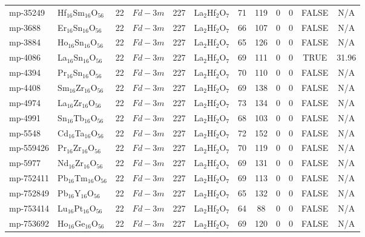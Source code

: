 {\begin{longtable}{llcccccccccc}
    mp-35249 & Hf$_{16}$Sm$_{16}$O$_{56}$ & 22    & $Fd-3m$ & 227   & La$_{2}$Hf$_{2}$O$_{7}$ & 71    & 119   & 0     & 0     & FALSE & N/A \\
    mp-3688 & Er$_{16}$Sn$_{16}$O$_{56}$ & 22    & $Fd-3m$ & 227   & La$_{2}$Hf$_{2}$O$_{7}$ & 66    & 107   & 0     & 0     & FALSE & N/A \\
    mp-3884 & Ho$_{16}$Sn$_{16}$O$_{56}$ & 22    & $Fd-3m$ & 227   & La$_{2}$Hf$_{2}$O$_{7}$ & 65    & 126   & 0     & 0     & FALSE & N/A \\
    mp-4086 & La$_{16}$Sn$_{16}$O$_{56}$ & 22    & $Fd-3m$ & 227   & La$_{2}$Hf$_{2}$O$_{7}$ & 69    & 111   & 0     & 0     & TRUE  & 31.96  \\
    mp-4394 & Pr$_{16}$Sn$_{16}$O$_{56}$ & 22    & $Fd-3m$ & 227   & La$_{2}$Hf$_{2}$O$_{7}$ & 70    & 110   & 0     & 0     & FALSE & N/A \\
    mp-4408 & Sm$_{16}$Zr$_{16}$O$_{56}$ & 22    & $Fd-3m$ & 227   & La$_{2}$Hf$_{2}$O$_{7}$ & 69    & 138   & 0     & 0     & FALSE & N/A \\
    mp-4974 & La$_{16}$Zr$_{16}$O$_{56}$ & 22    & $Fd-3m$ & 227   & La$_{2}$Hf$_{2}$O$_{7}$ & 73    & 134   & 0     & 0     & FALSE & N/A \\
    mp-4991 & Sn$_{16}$Tb$_{16}$O$_{56}$ & 22    & $Fd-3m$ & 227   & La$_{2}$Hf$_{2}$O$_{7}$ & 68    & 103   & 0     & 0     & FALSE & N/A \\
    mp-5548 & Cd$_{16}$Ta$_{16}$O$_{56}$ & 22    & $Fd-3m$ & 227   & La$_{2}$Hf$_{2}$O$_{7}$ & 72    & 152   & 0     & 0     & FALSE & N/A \\
    mp-559426 & Pr$_{16}$Zr$_{16}$O$_{56}$ & 22    & $Fd-3m$ & 227   & La$_{2}$Hf$_{2}$O$_{7}$ & 70    & 119   & 0     & 0     & FALSE & N/A \\
    mp-5977 & Nd$_{16}$Zr$_{16}$O$_{56}$ & 22    & $Fd-3m$ & 227   & La$_{2}$Hf$_{2}$O$_{7}$ & 69    & 131   & 0     & 0     & FALSE & N/A \\
    mp-752411 & Pb$_{16}$Tm$_{16}$O$_{56}$ & 22    & $Fd-3m$ & 227   & La$_{2}$Hf$_{2}$O$_{7}$ & 69    & 113   & 0     & 0     & FALSE & N/A \\
    mp-752849 & Pb$_{16}$Y$_{16}$O$_{56}$ & 22    & $Fd-3m$ & 227   & La$_{2}$Hf$_{2}$O$_{7}$ & 65    & 132   & 0     & 0     & FALSE & N/A \\
    mp-753414 & Lu$_{16}$Pt$_{16}$O$_{56}$ & 22    & $Fd-3m$ & 227   & La$_{2}$Hf$_{2}$O$_{7}$ & 64    & 88    & 0     & 0     & FALSE & N/A \\
    mp-753692 & Ho$_{16}$Ge$_{16}$O$_{56}$ & 22    & $Fd-3m$ & 227   & La$_{2}$Hf$_{2}$O$_{7}$ & 69    & 120   & 0     & 0     & FALSE & N/A \\

\end{longtable}}
